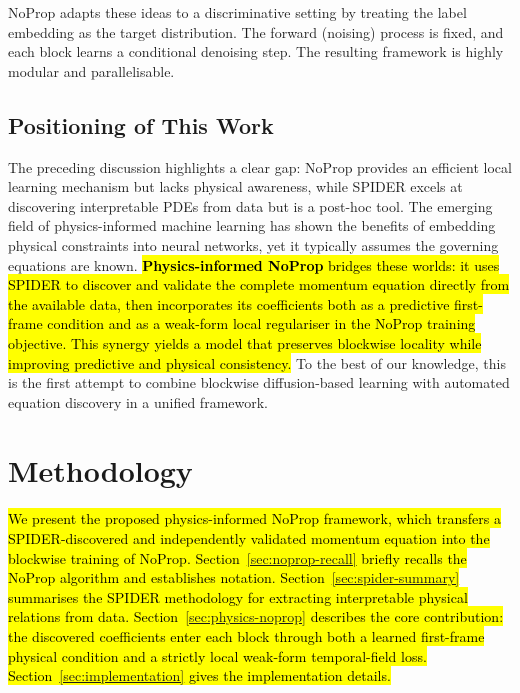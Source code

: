 \documentclass[preprint,12pt]{elsarticle}
\newcommand{\rev}[1]{\hl{#1}}
\begin{document}
NoProp adapts these ideas to a discriminative setting by treating the label embedding as the target distribution. The forward (noising) process is fixed, and each block learns a conditional denoising step. The resulting framework is highly modular and parallelisable.

\subsection{Positioning of This Work}
\label{sec:positioning}

The preceding discussion highlights a clear gap: NoProp provides an efficient local learning mechanism but lacks physical awareness, while SPIDER excels at discovering interpretable PDEs from data but is a post-hoc tool. The emerging field of physics-informed machine learning has shown the benefits of embedding physical constraints into neural networks, yet it typically assumes the governing equations are known. \rev{\textbf{Physics-informed NoProp} bridges these worlds: it uses SPIDER to discover and validate the complete momentum equation directly from the available data, then incorporates its coefficients both as a predictive first-frame condition and as a weak-form local regulariser in the NoProp training objective. This synergy yields a model that preserves blockwise locality while improving predictive and physical consistency.} To the best of our knowledge, this is the first attempt to combine blockwise diffusion-based learning with automated equation discovery in a unified framework.

\section{Methodology}
\label{sec:methodology}

\rev{We present the proposed physics-informed NoProp framework, which transfers a SPIDER-discovered and independently validated momentum equation into the blockwise training of NoProp. Section~\ref{sec:noprop-recall} briefly recalls the NoProp algorithm \cite{li2025noprop} and establishes notation. Section~\ref{sec:spider-summary} summarises the SPIDER methodology \cite{gurevich2024learning} for extracting interpretable physical relations from data. Section~\ref{sec:physics-noprop} describes the core contribution: the discovered coefficients enter each block through both a learned first-frame physical condition and a strictly local weak-form temporal-field loss. Section~\ref{sec:implementation} gives the implementation details.}
\end{document}
